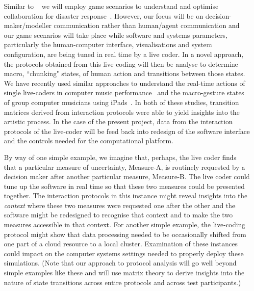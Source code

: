 \documentclass[a4paper,fontsize=13pt]{scrartcl}
\begin{document}
Similar to ~\parencite{ramchurn2016human} we will employ game scenarios to understand and optimise 
collaboration for disaster response~\parencite{ramchurn2016human}.
However, our focus will be on  decision-maker/modeller communication rather than human/agent communication and our game scenarios will take place while software and systems parameters, particularly the human-computer interface, visualisations and system configuration, are being tuned in real time by a live coder.  
In a novel approach, the protocols obtained from this live coding will then be analyse to determine macro, ``chunking" states, of human action and transitions between those states. 
We have recently used similar approaches to understand the real-time actions of single live-coders in computer music performance~\parencite{swift2014coding} and the macro-gesture states of group computer musicians using iPads~\parencite{martin2015tracking}. 
In both of these studies, transition matrices derived from interaction protocols were able to yield insights into the artistic process. 
In the case of the present project, data from the interaction protocols of the live-coder will be feed back into redesign of the software interface and the controls needed for the computational platform.

By way of one simple example, we imagine that, perhaps, the live coder finds that a particular measure of uncertainty, Measure-A, is routinely requested by a decision maker after another particular measure, Measure-B. The live coder could tune up the software in real time so that these two measures could be presented together. The interaction protocols in this instance might reveal insights into the {\em context} where these two measures were requested one after the other and the software might be redesigned to recognise that context and to make the two measures accessible in that context. For another simple example, the live-coding protocol might show that data processing needed to be occasionally shifted from one part of a cloud resource to a local cluster. Examination of these instances could impact on the computer systems settings needed to properly deploy these simulations. (Note that our approach to protocol analysis will go well beyond simple examples like these and will use matrix theory to derive insights into the nature of state transitions across entire protocols and across test participants.)\\


\\
\end{document}
